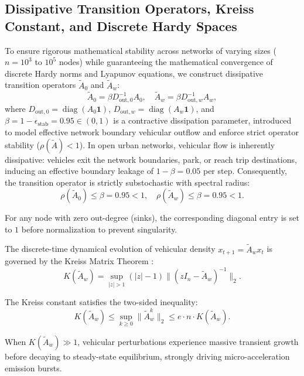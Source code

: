 \documentclass[journal]{IEEEtran}
\begin{document}
\subsection{Dissipative Transition Operators, Kreiss Constant, and Discrete Hardy Spaces}
To ensure rigorous mathematical stability across networks of varying sizes ($n = 10^3$ to $10^5$ nodes) while guaranteeing the mathematical convergence of discrete Hardy norms and Lyapunov equations, we construct dissipative transition operators $\tilde{A}_0$ and $\tilde{A}_w$:
\begin{equation}
\tilde{A}_0 = \beta D_{\text{out}, 0}^{-1} A_0, \quad \tilde{A}_w = \beta D_{\text{out}, w}^{-1} A_w,
\label{eq:normalized_A}
\end{equation}
where $D_{\text{out}, 0} = \operatorname{diag}(A_0 \mathbf{1})$, $D_{\text{out}, w} = \operatorname{diag}(A_w \mathbf{1})$, and $\beta = 1 - \epsilon_{\text{stab}} = 0.95 \in (0, 1)$ is a contractive dissipation parameter, introduced to model effective network boundary vehicular outflow and enforce strict operator stability ($\rho(\tilde{A}) < 1$). In open urban networks, vehicular flow is inherently dissipative: vehicles exit the network boundaries, park, or reach trip destinations, inducing an effective boundary leakage of $1 - \beta = 0.05$ per step. Consequently, the transition operator is strictly substochastic with spectral radius:
\begin{equation}
\rho(\tilde{A}_0) \le \beta = 0.95 < 1, \quad \rho(\tilde{A}_w) \le \beta = 0.95 < 1.
\label{eq:spectral_radius_beta}
\end{equation}

For any node with zero out-degree (sinks), the corresponding diagonal entry is set to $1$ before normalization to prevent singularity.

The discrete-time dynamical evolution of vehicular density $x_{t+1} = \tilde{A}_w x_t$ is governed by the Kreiss Matrix Theorem \cite{Kreiss1962}:
\begin{equation}
K(\tilde{A}_w) = \sup_{|z| > 1} (|z| - 1) \| (z I_n - \tilde{A}_w)^{-1} \|_2.
\label{eq:kreiss}
\end{equation}

The Kreiss constant satisfies the two-sided inequality:
\begin{equation}
K(\tilde{A}_w) \le \sup_{k \ge 0} \| \tilde{A}_w^k \|_2 \le e \cdot n \cdot K(\tilde{A}_w).
\label{eq:kreiss_bound}
\end{equation}

When $K(\tilde{A}_w) \gg 1$, vehicular perturbations experience massive transient growth before decaying to steady-state equilibrium, strongly driving micro-acceleration emission bursts.
\end{document}
